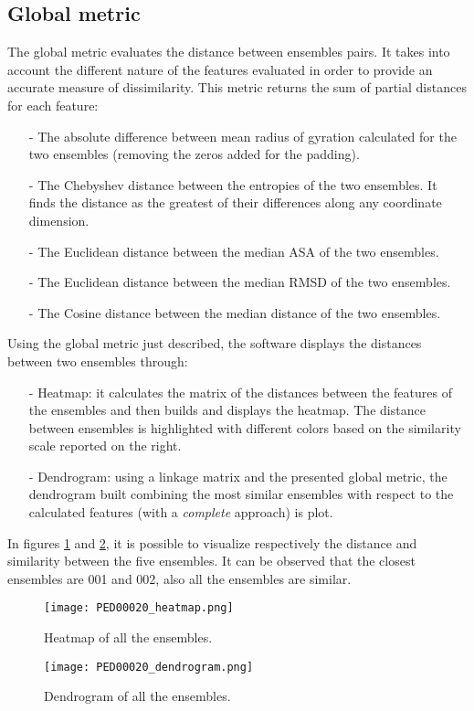 \subsection{Global metric}
The global metric evaluates the distance between ensembles pairs. It takes into account the different nature of the features evaluated in order to provide an accurate measure of dissimilarity.
This metric returns the sum of partial distances for each feature:
\begin{itemize}
\item[-] The absolute difference between mean radius of gyration calculated for the two ensembles (removing the zeros added for the padding).
\item[-] The Chebyshev distance between the entropies of the two ensembles. It finds the distance as the greatest of their differences along any coordinate dimension.
\item[-] The Euclidean distance between the median ASA of the two ensembles.
\item[-] The Euclidean distance between the median RMSD of the two ensembles.
\item[-] The Cosine distance between the median distance of the two ensembles.
\end{itemize}


Using the global metric just described, the software displays the distances between two ensembles through:
\begin{itemize}
\item[-] Heatmap: it calculates the matrix of the distances between the features of the ensembles and then builds and displays the heatmap. The distance between ensembles is highlighted with different colors based on the similarity scale reported on the right. 
\item[-] Dendrogram: using a linkage matrix and the presented global metric, the dendrogram built combining the most similar ensembles with respect to the calculated features (with a \emph{complete} approach) is plot.
\end{itemize}

In figures \ref{heatmap} and \ref{dendrogram}, it is possible to visualize respectively the distance and similarity between the five ensembles. It can be observed that the closest ensembles are 001 and 002, also all the ensembles are similar.

\begin{figure}[H]
	\begin{minipage}[b]{0.93\textwidth}
		\centering
		\texttt{[image: PED00020\_heatmap.png]}
		\caption{Heatmap of all the ensembles.}
		\label{heatmap}
	\end{minipage}
\end{figure}
\begin{figure}[H]
	\begin{minipage}[b]{0.93\textwidth}
		\centering
		\texttt{[image: PED00020\_dendrogram.png]}
		\caption{Dendrogram of all the ensembles.}
		\label{dendrogram}
	\end{minipage}
\end{figure}



